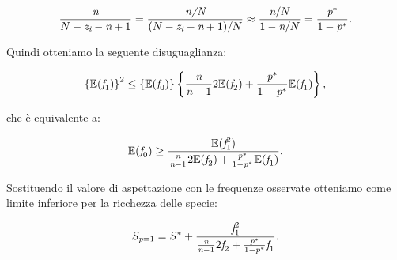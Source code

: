 $$
 \frac{\emph{n}}{N-\emph{z}_\emph{i}-\emph{n}+1}=\frac{\emph{n/N}}{(N-\emph{z}_\emph{i}-\emph{n}+1)/N} \approx \frac{\emph{n}/N}{1-\emph{n}/N}=\frac{\emph{p}^*}{1-\emph{p}^*}.
 $$
 
 Quindi otteniamo la seguente disuguaglianza:
 
$$
\left \{ \mathbb{E}(\emph{f}_1) \right \}^2 \le \left \{ \mathbb{E}(\emph{f}_0) \right \}\left \{ \frac{\emph{n}}{\emph{n}-1}2\mathbb{E}(\emph{f}_2) + \frac{\emph{p}^*}{1-\emph{p}^*}\mathbb{E}(\emph{f}_1) \right \},
$$

che è equivalente a:


\begin{equation}
\mathbb{E}(\emph{f}_0) \ge \frac{\mathbb{E}(\emph{f}_1^2)}{\frac{\emph{n}}{\emph{n}-1}2\mathbb{E}(\emph{f}_2)+ \frac{\emph{p}^*}{1-\emph{p}^*}\mathbb{E}(\emph{f}_1)}.
\end{equation}

Sostituendo il valore di aspettazione con le frequenze osservate otteniamo come limite inferiore per la ricchezza delle specie:

\begin{equation}
    S_{\emph{p}=1}= S^* +\frac{\emph{f}_1^2}{\frac{\emph{n}}{\emph{n}-1}2\emph{f}_2+ \frac{\emph{p}^*}{1-\emph{p}^*}\emph{f}_1}.
    \label{eq:chaoworestimator}
\end{equation}




